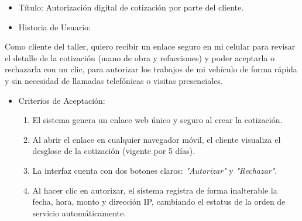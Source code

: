 \documentclass[
  spanish,
  11pt,
  letterpaper,
]{article}
\begin{document}
\begin{itemize}
\item
  Título: Autorización digital de cotización por parte del cliente.
\item
  Historia de Usuario:
\end{itemize}

Como cliente del taller, quiero recibir un enlace seguro en mi celular
para revisar el detalle de la cotización (mano de obra y refacciones) y
poder aceptarla o rechazarla con un clic, para autorizar los trabajos de
mi vehículo de forma rápida y sin necesidad de llamadas telefónicas o
visitas presenciales.

\begin{itemize}
\item
  Criterios de Aceptación:

  \begin{enumerate}
  \def\labelenumi{\arabic{enumi}.}
  \item
    El sistema genera un enlace web único y seguro al crear la
    cotización.
  \item
    Al abrir el enlace en cualquier navegador móvil, el cliente
    visualiza el desglose de la cotización (vigente por 5 días).
  \item
    La interfaz cuenta con dos botones claros: \emph{"Autorizar"} y
    \emph{"Rechazar"}.
  \item
    Al hacer clic en autorizar, el sistema registra de forma inalterable
    la fecha, hora, monto y dirección IP, cambiando el estatus de la
    orden de servicio automáticamente.
  \end{enumerate}
\end{itemize}
\end{document}

